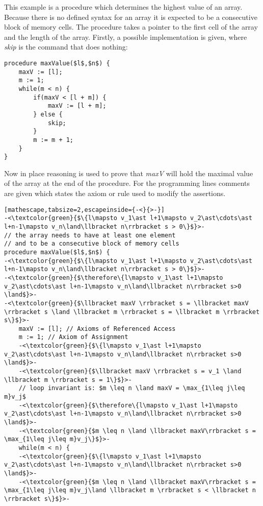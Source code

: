 	\begin{myexp}
		This example is a procedure which determines the highest value
		of an array. Because there is no defined syntax for an array it
		is expected to be a consecutive block of memory cells. The procedure
		takes a pointer to the first cell of the array and the length of the
		array. Firstly, a possible implementation is given, where \emph{skip}
		is the command that does nothing:
		\begin{lstlisting}[mathescape]
procedure maxValue($l$,$n$) {
	maxV := [l];
	m := 1;
	while(m < n) {
		if(maxV < [l + m]) {
			maxV := [l + m];
		} else {
			skip;
		}
		m := m + 1;
	}
}
		\end{lstlisting}
		Now in place reasoning is used to prove that \emph{maxV} will hold
		the maximal value of the array at the end of the procedure. For the
		programming lines comments are given which states the axiom or rule used to
		modify the assertions.
		\begin{lstlisting}[mathescape,tabsize=2,escapeinside={-<}{>-}]
-<\textcolor{green}{$\{l\mapsto v_1\ast l+1\mapsto v_2\ast\cdots\ast l+n-1\mapsto v_n\land\llbracket n\rrbracket s > 0\}$}>-
// the array needs to have at least one element
// and to be a consecutive block of memory cells
procedure maxValue($l$,$n$) {
-<\textcolor{green}{$\{l\mapsto v_1\ast l+1\mapsto v_2\ast\cdots\ast l+n-1\mapsto v_n\land\llbracket n\rrbracket s > 0\}$}>-
-<\textcolor{green}{$\therefore\{l\mapsto v_1\ast l+1\mapsto v_2\ast\cdots\ast l+n-1\mapsto v_n\land\llbracket n\rrbracket s>0 \land$}>-
-<\textcolor{green}{$\llbracket maxV \rrbracket s = \llbracket maxV \rrbracket s \land \llbracket m \rrbracket s = \llbracket m \rrbracket s\}$}>-
	maxV := [l]; // Axioms of Referenced Access
	m := 1; // Axiom of Assignment
	-<\textcolor{green}{$\{l\mapsto v_1\ast l+1\mapsto v_2\ast\cdots\ast l+n-1\mapsto v_n\land\llbracket n\rrbracket s>0 \land$}>-
	-<\textcolor{green}{$\llbracket maxV \rrbracket s = v_1 \land \llbracket m \rrbracket s = 1\}$}>-
	// loop invariant is: $m \leq n \land maxV = \max_{1\leq j\leq m}v_j$
	-<\textcolor{green}{$\therefore\{l\mapsto v_1\ast l+1\mapsto v_2\ast\cdots\ast l+n-1\mapsto v_n\land\llbracket n\rrbracket s>0 \land$}>-
	-<\textcolor{green}{$m \leq n \land \llbracket maxV\rrbracket s = \max_{1\leq j\leq m}v_j\}$}>-
	while(m < n) {
	-<\textcolor{green}{$\{l\mapsto v_1\ast l+1\mapsto v_2\ast\cdots\ast l+n-1\mapsto v_n\land\llbracket n\rrbracket s>0 \land$}>-
	-<\textcolor{green}{$m \leq n \land \llbracket maxV\rrbracket s = \max_{1\leq j\leq m}v_j\land \llbracket m \rrbracket s < \llbracket n \rrbracket s\}$}>-

\end{lstlisting}
\end{myexp}
